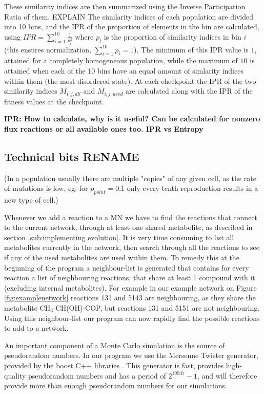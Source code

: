 \documentclass[10pt,a4paper]{article}
\begin{document}
These similarity indices are then summarized using the Inverse Participation Ratio of them. EXPLAIN  The similarity indices of each population are divided into 10 bins, and the IPR of the proportion of elements in the bin are calculated, using $IPR= \sum^{10}_{i=1} \frac{1}{p_i^2} $ where $p_i$ is the proportion of similarity indices in bin $i$ (this ensures normalization, $ \sum^{10}_{i=1} p_i=1$). The minimum of this IPR value is $1$, attained for a completely homogeneous population, while the maximum of $10$ is attained when each of the 10 bins have an equal amount of simlarity indices within them (the most disordered state).  At each checkpoint the IPR of the two similarity indices $M_{i,j,all}$ and $M_{i,j,used}$ are calculated along with the IPR of the fitness values at the checkpoint. 

\textbf{IPR: How to calculate, why is it useful? Can be calculated for nonzero flux reactions or all available ones too. IPR vs Entropy}






\subsection{Technical bits RENAME}
\label{sub:technical_bits}

(In a population usually there are multiple "copies" of any given cell, as the rate of mutations is low, eg. for $p_{point}=0.1$ only every tenth reproduction results in a new type of cell.)

	Whenever we add a reaction to a MN we have to find the reactions that connect to the current network, through at least one shared metabolite, as described in section \ref{sub:implementing evolution}. It is very time consuming to list all metabolites currently in the network, then search through all the reactions to see if any of the used metabolites are used within them. To remedy this at the beginning of the program a neighbour-list is generated that contains for every reaction a list of neighbouring reactions, that share at least 1 compound with it (excluding internal metabolites). For example in our example network on Figure \ref{fig:examplenetwork} reactions 131 and 5143 are neighbouring, as they share the metabolite CH$_3$-CH(OH)-COP, but reactions 131 and 5151 are not neighbouring. Using this neighbour-list our program can now rapidly find the possible reactions to add to a network. 

	An important component of a Monte Carlo simulation is the source of pseudorandom numbers. In our program we use the Mersenne Twister \cite{mersennetwister} generator, provided by the boost C++ libraries \cite{boostlibraries}. This generator is fast, provides high-quality pseudorandom numbers and has a period of $2^{19937}-1$, and will therefore provide more than enough pseudorandom numbers for our simulations.
\end{document}

